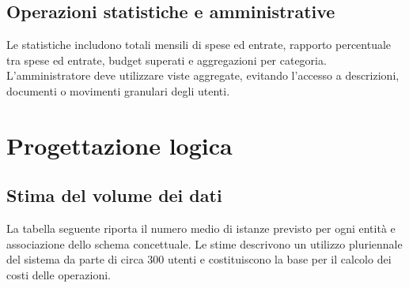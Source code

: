 \documentclass[11pt,a4paper]{article}
\begin{document}
\subsection{Operazioni statistiche e amministrative}
Le statistiche includono totali mensili di spese ed entrate, rapporto percentuale tra spese ed entrate, budget superati e aggregazioni per categoria. L'amministratore deve utilizzare viste aggregate, evitando l'accesso a descrizioni, documenti o movimenti granulari degli utenti.

\section{Progettazione logica}
\subsection{Stima del volume dei dati}
La tabella seguente riporta il numero medio di istanze previsto per ogni entità e associazione dello schema concettuale. Le stime descrivono un utilizzo pluriennale del sistema da parte di circa 300 utenti e costituiscono la base per il calcolo dei costi delle operazioni.
\end{document}

